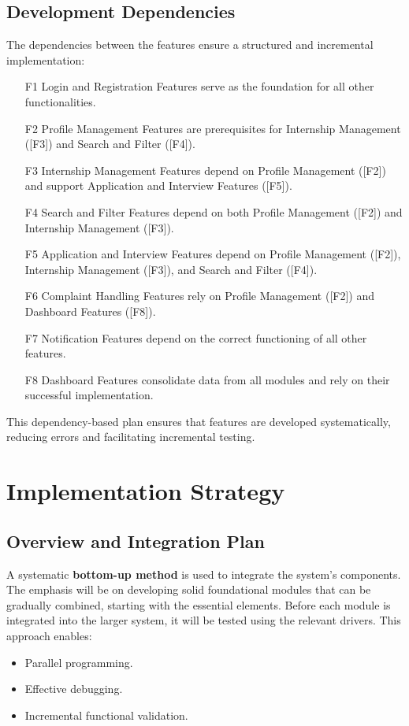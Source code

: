 \subsection{Development Dependencies}
\label{subsec:development_dependencies}

The dependencies between the features ensure a structured and incremental implementation:
\begin{enumerate}
    \item [F1] Login and Registration Features serve as the foundation for all other functionalities.
    \item [F2] Profile Management Features are prerequisites for Internship Management ([F3]) and Search and Filter ([F4]).
    \item [F3] Internship Management Features depend on Profile Management ([F2]) and support Application and Interview Features ([F5]).
    \item [F4] Search and Filter Features depend on both Profile Management ([F2]) and Internship Management ([F3]).
    \item [F5] Application and Interview Features depend on Profile Management ([F2]), Internship Management ([F3]), and Search and Filter ([F4]).
    \item [F6] Complaint Handling Features rely on Profile Management ([F2]) and Dashboard Features ([F8]).
    \item [F7] Notification Features depend on the correct functioning of all other features.
    \item [F8] Dashboard Features consolidate data from all modules and rely on their successful implementation.
\end{enumerate}

This dependency-based plan ensures that features are developed systematically, reducing errors and facilitating incremental testing.

\section{Implementation Strategy}
\label{subsec:implementation_strategy}

\subsection{Overview and Integration Plan}
\label{subsubsec:integration_plan}

A systematic \textbf{bottom-up method} is used to integrate the system's components. The emphasis will be on developing solid foundational modules that can be gradually combined, starting with the essential elements. Before each module is integrated into the larger system, it will be tested using the relevant drivers. This approach enables:
\begin{itemize}
    \item Parallel programming.
    \item Effective debugging.
    \item Incremental functional validation.
\end{itemize}

